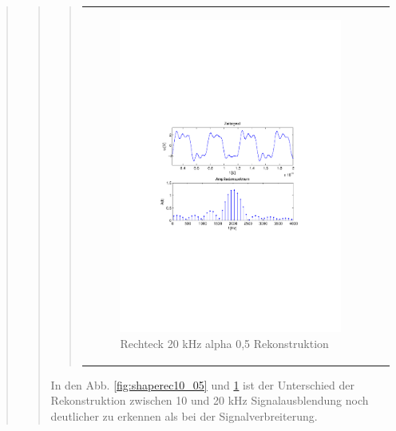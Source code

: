 \begin{quote}
\begin{quote}
\begin{quote}
\begin{center}
\begin{tabular}{ll}
                \begin{minipage}{0.6\textwidth}
                    \begin{figure}[H]
                        \includegraphics[scale=0.7, trim = 35mm 100mm 35mm 95mm, clip]{Bilder/shaperec20_05}
                       \caption{Rechteck 20 kHz alpha 0,5 Rekonstruktion}
		              \label{fig:shaperec20_05}
                    \end{figure}
                \end{minipage}
            
            \end{tabular}
            \end{center}
            
        \end{quote}
        
        In den Abb. \ref{fig:shaperec10_05} und \ref{fig:shaperec20_05} ist der Unterschied der Rekonstruktion zwischen
        10 und 20 kHz Signalausblendung noch deutlicher zu erkennen als bei der Signalverbreiterung.
        

\end{quote}
\end{quote}
